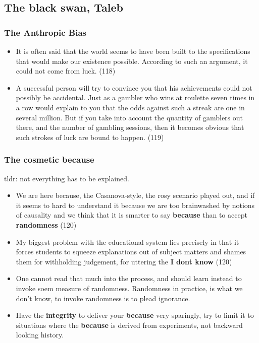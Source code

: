 \documentclass[11pt]{article}
\begin{document}
\subsection{The black swan, Taleb}
\subsubsection{The Anthropic Bias}
\begin{itemize}
 \item {
       It is often said that the world seems to have been built to the specifications that would make our existence possible. According to such an argument, it could not come from luck. (118)
       }
       \item{
                   A successful person will try to convince you that his achievements could not possibly be accidental. Just as a gambler who wins at roulette seven times in a row would explain to you that the odds against such a streak are one in several million. But if you take into account the quantity of gamblers out there, and the number of gambling sessions, then it becomes obvious that such strokes of luck are bound to happen.  (119)
             }
\end{itemize}
\subsubsection{The cosmetic because}
tldr: not everything has to be explained.
\begin{itemize}
 \item We are here because, the Casanova-style, the rosy scenario played out, and if it seems to hard to understand it because we are too brainwashed by notions of causality and we think that it is smarter to say \textbf{because} than to accept \textbf{randomness} (120)
 \item My biggest problem with the educational system lies precisely in that it forces students to squeeze explanations out of subject matters and shames them for withholding judgement, for uttering the \textbf{I dont know } (120)
 \item One cannot read that much into the process, and should learn instead to invoke soem measure of randomness. Randomness in practice, is what we don't know, to invoke randomness is to plead ignorance.
 \item Have the \textbf{integrity} to deliver your \textbf{because} very sparingly, try to limit it to situations where the \textbf{because} is derived from experiments, not backward looking history.
\end{itemize}
\end{document}
